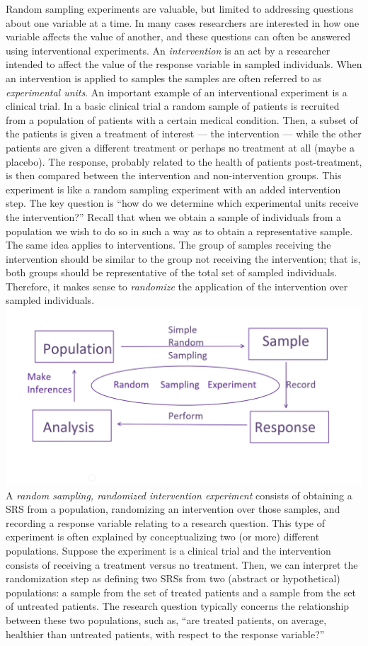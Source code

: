 \documentclass[
]{book}
\begin{document}
Random sampling experiments are valuable, but limited to addressing questions about one variable at a time. In many cases researchers are interested in how one variable affects the value of another, and these questions can often be answered using interventional experiments. An \emph{intervention} is an act by a researcher intended to affect the value of the response variable in sampled individuals. When an intervention is applied to samples the samples are often referred to as \emph{experimental units}. An important example of an interventional experiment is a clinical trial. In a basic clinical trial a random sample of patients is recruited from a population of patients with a certain medical condition. Then, a subset of the patients is given a treatment of interest --- the intervention --- while the other patients are given a different treatment or perhaps no treatment at all (maybe a placebo). The response, probably related to the health of patients post-treatment, is then compared between the intervention and non-intervention groups. This experiment is like a random sampling experiment with an added intervention step. The key question is ``how do we determine which experimental units receive the intervention?'' Recall that when we obtain a sample of individuals from a population we wish to do so in such a way as to obtain a representative sample. The same idea applies to interventions. The group of samples receiving the intervention should be similar to the group not receiving the intervention; that is, both groups should be representative of the total set of sampled individuals. Therefore, it makes sense to \emph{randomize} the application of the intervention over sampled individuals.
\includegraphics{rsediagram.PNG}
A \emph{random sampling, randomized intervention experiment} consists of obtaining a SRS from a population, randomizing an intervention over those samples, and recording a response variable relating to a research question. This type of experiment is often explained by conceptualizing two (or more) different populations. Suppose the experiment is a clinical trial and the intervention consists of receiving a treatment versus no treatment. Then, we can interpret the randomization step as defining two SRSs from two (abstract or hypothetical) populations: a sample from the set of treated patients and a sample from the set of untreated patients. The research question typically concerns the relationship between these two populations, such as, ``are treated patients, on average, healthier than untreated patients, with respect to the response variable?''
\end{document}
